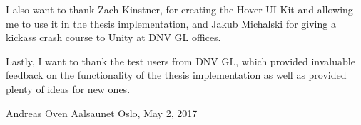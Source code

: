I also want to thank Zach Kinstner, for creating the Hover UI Kit and allowing me to use it in the thesis implementation, and 
Jakub Michalski for giving a kickass crash course to Unity at DNV GL offices. 

Lastly, I want to thank the test users from DNV GL, which provided invaluable feedback on the functionality of the thesis implementation 
as well as provided plenty of ideas for new ones.

Andreas Oven Aalsaunet
Oslo, May 2, 2017






